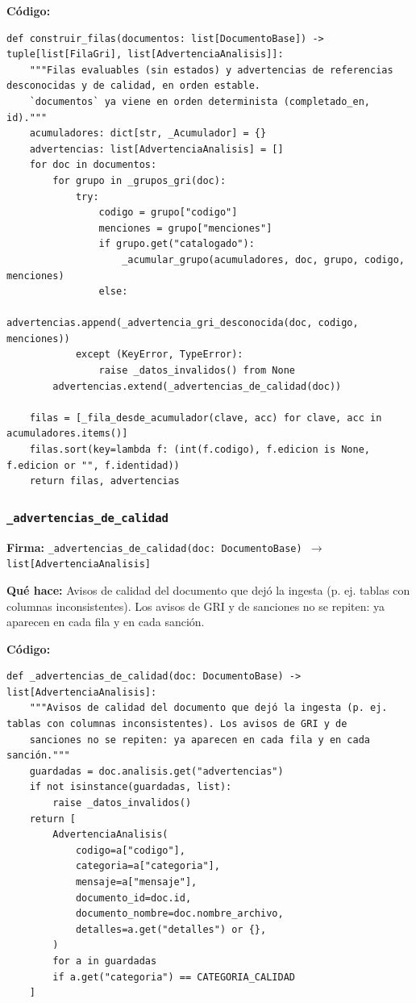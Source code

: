 \documentclass[11pt,a4paper]{article}
\begin{document}
\textbf{Código:}
\begin{lstlisting}
def construir_filas(documentos: list[DocumentoBase]) -> tuple[list[FilaGri], list[AdvertenciaAnalisis]]:
    """Filas evaluables (sin estados) y advertencias de referencias desconocidas y de calidad, en orden estable.
    `documentos` ya viene en orden determinista (completado_en, id)."""
    acumuladores: dict[str, _Acumulador] = {}
    advertencias: list[AdvertenciaAnalisis] = []
    for doc in documentos:
        for grupo in _grupos_gri(doc):
            try:
                codigo = grupo["codigo"]
                menciones = grupo["menciones"]
                if grupo.get("catalogado"):
                    _acumular_grupo(acumuladores, doc, grupo, codigo, menciones)
                else:
                    advertencias.append(_advertencia_gri_desconocida(doc, codigo, menciones))
            except (KeyError, TypeError):
                raise _datos_invalidos() from None
        advertencias.extend(_advertencias_de_calidad(doc))

    filas = [_fila_desde_acumulador(clave, acc) for clave, acc in acumuladores.items()]
    filas.sort(key=lambda f: (int(f.codigo), f.edicion is None, f.edicion or "", f.identidad))
    return filas, advertencias
\end{lstlisting}

\subsubsection*{\texttt{\_advertencias\_de\_calidad}}
\textbf{Firma:} \texttt{\_advertencias\_de\_calidad(doc: DocumentoBase) $\rightarrow$ list[AdvertenciaAnalisis]}

\textbf{Qué hace:} Avisos de calidad del documento que dejó la ingesta (p. ej. tablas con columnas inconsistentes). Los avisos de GRI y de
sanciones no se repiten: ya aparecen en cada fila y en cada sanción.

\textbf{Código:}
\begin{lstlisting}
def _advertencias_de_calidad(doc: DocumentoBase) -> list[AdvertenciaAnalisis]:
    """Avisos de calidad del documento que dejó la ingesta (p. ej. tablas con columnas inconsistentes). Los avisos de GRI y de
    sanciones no se repiten: ya aparecen en cada fila y en cada sanción."""
    guardadas = doc.analisis.get("advertencias")
    if not isinstance(guardadas, list):
        raise _datos_invalidos()
    return [
        AdvertenciaAnalisis(
            codigo=a["codigo"],
            categoria=a["categoria"],
            mensaje=a["mensaje"],
            documento_id=doc.id,
            documento_nombre=doc.nombre_archivo,
            detalles=a.get("detalles") or {},
        )
        for a in guardadas
        if a.get("categoria") == CATEGORIA_CALIDAD
    ]
\end{lstlisting}
\end{document}
